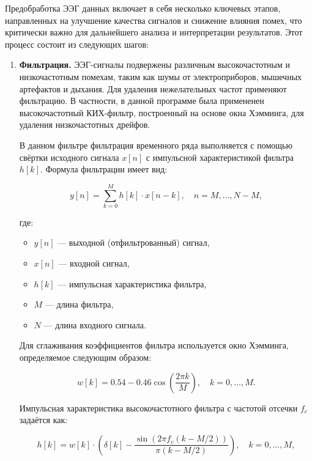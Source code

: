 Предобработка ЭЭГ данных включает в себя несколько ключевых этапов, направленных на улучшение качества сигналов и снижение влияния помех, что критически важно для дальнейшего анализа и интерпретации результатов. Этот процесс состоит из следующих шагов:
\begin{enumerate}
\item \textbf{Фильтрация.}
\newline
ЭЭГ-сигналы подвержены различным высокочастотным и низкочастотным помехам, таким как шумы от электроприборов, мышечных артефактов и дыхания. Для удаления нежелательных частот применяют фильтрацию.
В частности, в данной программе была примененен высокочастотный КИХ-фильтр, построенный на основе окна Хэмминга, для удаления низкочастотных дрейфов.

В данном фильтре фильтрация временного ряда выполняется с помощью свёртки исходного сигнала \(x[n]\) с импульсной характеристикой фильтра \(h[k]\). Формула фильтрации имеет вид:

\begin{equation}
y[n] = \sum_{k=0}^{M} h[k] \cdot x[n-k], \quad n = M, \dots, N-M,
\label{eq:fir_filter}
\end{equation}

где:
\begin{itemize}
    \item \(y[n]\) — выходной (отфильтрованный) сигнал,
    \item \(x[n]\) — входной сигнал,
    \item \(h[k]\) — импульсная характеристика фильтра,
    \item \(M\) — длина фильтра,
    \item \(N\) — длина входного сигнала.
\end{itemize}

Для сглаживания коэффициентов фильтра используется окно Хэмминга, определяемое следующим образом:

\begin{equation}
w[k] = 0.54 - 0.46 \cos\left( \frac{2 \pi k}{M} \right), \quad k = 0, \dots, M.
\label{eq:hamming_window}
\end{equation}

Импульсная характеристика высокочастотного фильтра с частотой отсечки \(f_c\) задаётся как:

\begin{equation}
h[k] = w[k] \cdot \left( \delta[k] - \frac{\sin(2 \pi f_c (k - M/2))}{\pi (k - M/2)} \right), \quad k = 0, \dots, M,
\label{eq:filter_kernel}
\end{equation}


\end{enumerate}
